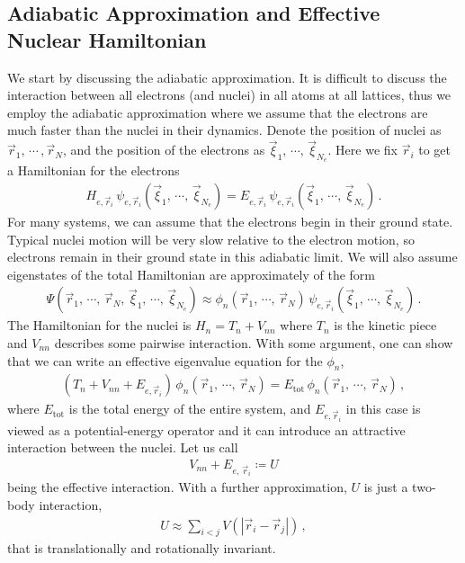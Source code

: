 \documentclass[11pt, oneside]{book}
\theoremstyle{break}
\theoremstyle{break}
\begin{document}
\subsection{Adiabatic Approximation and Effective Nuclear Hamiltonian}
We start by discussing the adiabatic approximation. It is difficult to discuss the interaction between all electrons (and nuclei) in all atoms at all lattices, thus we employ the adiabatic approximation where we assume that the electrons are much faster than the nuclei in their dynamics. Denote the position of nuclei as $\vec{r}_1,\,\cdots\,, \vec{r}_N$, and the position of the electrons as $\vec{\xi}_1,\,\cdots,\, \vec{\xi}_{N_e}$. Here we fix $\vec{r}_i$ to get a Hamiltonian for the electrons
\begin{align*}
H_{e, \vec{r}_i}\, \psi_{e,\vec{r}_i}(\vec{\xi}_1,\,\cdots,\, \vec{\xi}_{N_e}) = E_{e, \vec{r}_i}\,\psi_{e,\vec{r}_i}(\vec{\xi}_1,\,\cdots,\, \vec{\xi}_{N_e}) \,.
\end{align*}
For many systems, we can assume that the electrons begin in their ground state. Typical nuclei motion will be very slow relative to the electron motion, so electrons remain in their ground state in this adiabatic limit. We will also assume eigenstates of the total Hamiltonian are approximately of the form 
\begin{align*}
\Psi(\vec{r}_1,\, \cdots,\, \vec{r}_N,\, \vec{\xi}_1,\, \cdots,\, \vec{\xi}_{N_e}) \approx \phi_n(\vec{r}_1,\,\cdots,\, \vec{r}_N) \, \psi_{e,\vec{r}_i}(\vec{\xi}_1,\,\cdots,\, \vec{\xi}_{N_e}) \,.
\end{align*}
The Hamiltonian for the nuclei is $H_n = T_n + V_{nn}$ where $T_n$ is the kinetic piece and $V_{nn}$ describes some pairwise interaction. With some argument, one can show that we can write an effective eigenvalue equation for the $\phi_n$, 
\begin{align*}
(T_n + V_{nn} + E_{e, \vec{r}_i}) \, \phi_n(\vec{r}_1,\, \cdots, \, \vec{r}_N) = E_{\text{tot}}\,\phi_n(\vec{r}_1,\, \cdots, \, \vec{r}_N)\,,
\end{align*}
where $E_{\text{tot}}$ is the total energy of the entire system, and $E_{e, \vec{r}_i}$ in this case is viewed as a potential-energy operator and it can introduce an attractive interaction between the nuclei. Let us call
\begin{align*}
V_{nn} + E_{e,\,\vec{r}_i} \coloneqq U
\end{align*}
being the effective interaction. With a further approximation, $U$ is just a two-body interaction, 
\begin{align*}
U\approx \sum_{i<j} V(|\vec{r}_i - \vec{r}_j|)\,,
\end{align*}
that is translationally and rotationally invariant.
\end{document}
